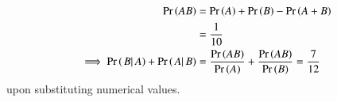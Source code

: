 \begin{align}
	\Pr\left(AB\right) &= \Pr\left(A\right) + \Pr\left(B\right) - \Pr\left(A + B\right)\\
	&= \frac{1}{10}
	\\
	\implies
	\Pr\left(\left. B \right| A\right) + \Pr\left(\left. A \right| B\right) &= \frac{\Pr\left(AB\right)}{\Pr\left(A\right)}+\frac{\Pr\left(AB\right)}{\Pr\left(B\right)}
	= \frac{7}{12}
\end{align}
upon substituting numerical values.


